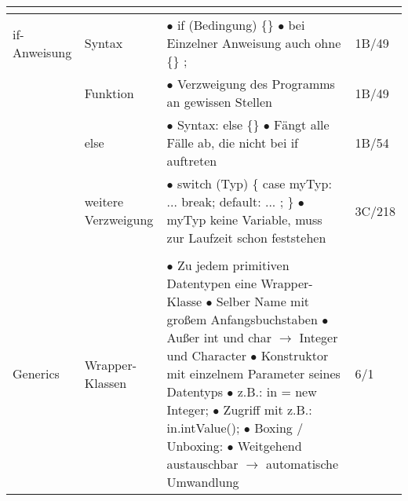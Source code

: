\documentclass[11pt,a4paper]{article}
\begin{document}
\begin{center}
\begin{longtable}[h]{ | p{2.3cm} | p{2.3cm} | p{12.6cm} | p{1.2cm} | }
	\multicolumn{3}{c}{} \\ 
	\hline 
	
	
	
	{\large if-Anweisung} & Syntax & \makecell[l]{$\bullet$ if (Bedingung) \{\} \\ 
	$\bullet$ bei Einzelner Anweisung auch ohne \{\} }; & 1B/49 \\ \cline{2-4}
	
	& Funktion & $\bullet$  Verzweigung des Programms an gewissen Stellen & 1B/49 \\ \cline{2-4}
	
	& else & \makecell[l]{$\bullet$ Syntax: else \{\} \\ $\bullet$ Fängt alle Fälle ab, die nicht bei if auftreten} & 1B/54 \\ \cline{2-4}
	
	& \makecell[l]{weitere \\ Verzweigung} & \makecell[l]{$\bullet$ switch (Typ) \{ \\ 
	\hspace{2.5cm} case myTyp: ... break; \\ \hspace{2.5cm} default: ... ; \} \\ 
	$\bullet$ myTyp keine  Variable, muss zur Laufzeit schon feststehen } & 3C/218 \\ 
	\hline
	
	
	
	\multicolumn{3}{c}{} \\ 
	\hline 	
	
	
	
	{\large Generics} & Wrapper-Klassen & \makecell[l]{$\bullet$ Zu jedem primitiven Datentypen eine Wrapper-Klasse \\ 
	$\bullet$ Selber Name mit großem Anfangsbuchstaben \\ 
	\hspace{0.4cm} $\bullet$ Außer int und char $\rightarrow$ Integer und Character \\ 
	$\bullet$ Konstruktor mit einzelnem Parameter seines Datentyps \\ $\bullet$ z.B.: in = new Integer; \\
	$\bullet$ Zugriff mit z.B.: in.intValue(); \\ $\bullet$ Boxing / Unboxing: \\ 
	\hspace{0.4cm} $\bullet$ Weitgehend austauschbar $\rightarrow$ automatische Umwandlung} & 6/1 \\ \cline{2-4}
	

\end{longtable}
\end{center}
\end{document}
